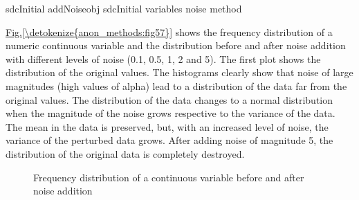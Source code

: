 \documentclass[letterpaper,10pt,english]{sphinxmanual}
\begin{document}
\def\sphinxLiteralBlockLabel{\label{\detokenize{anon_methods:code519}}}
%
\begin{sphinxVerbatim}[commandchars=\\\{\},numbers=left,firstnumber=1,stepnumber=1]
sdcInitial  addNoiseobj  sdcInitial
                       variables     
                                        
                                        
                       noise   method  
\end{sphinxVerbatim}

\hyperref[\detokenize{anon_methods:fig57}]{Fig.\@ \ref{\detokenize{anon_methods:fig57}}} shows the frequency distribution of a numeric continuous
variable and the distribution before and after noise addition with
different levels of noise (0.1, 0.5, 1, 2 and 5). The first plot shows
the distribution of the original values. The histograms clearly show
that noise of large magnitudes (high values of alpha) lead to a
distribution of the data far from the original values. The distribution
of the data changes to a normal distribution when the magnitude of the
noise grows respective to the variance of the data. The mean in the data
is preserved, but, with an increased level of noise, the variance of the
perturbed data grows. After adding noise of magnitude 5, the
distribution of the original data is completely destroyed.

\begin{figure}[htbp]
\centering
\capstart

\noindent{}
\caption{Frequency distribution of a continuous variable before and after noise addition}\label{\detokenize{anon_methods:fig57}}\label{\detokenize{anon_methods:id44}}\end{figure}
\end{document}
